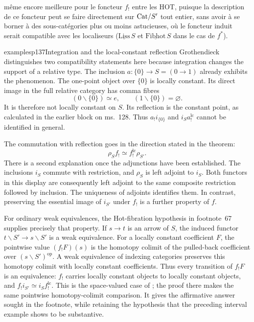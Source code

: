 même encore meilleure pour le foncteur $f_!$ entre les HOT, puisque la description de ce foncteur peut se faire directement sur $\mathrm{Cat}/S'$ tout entier, sans avoir à se borner à des sous-catégories plus ou moins astucieuses, où le foncteur induit serait compatible avec les localiseurs ($\underline{\mathrm{Liss}}\,S$ et $\underline{\mathrm{Fibhot}}\,S$ dans le cas de $f^*$).

\begin{dcomment}{examples}{p137}{Integration and the local-constant reflection}
Grothendieck distinguishes two compatibility statements here because integration changes the support of a relative type. The inclusion $a:\{0\}\to S=(0\to1)$ already exhibits the phenomenon. The one-point object over $\{0\}$ is locally constant. Its direct image in the full relative category has comma fibres
\[
 (0\backslash\{0\})\simeq e,
 \qquad (1\backslash\{0\})=\varnothing.
\]
It is therefore not locally constant on $S$. Its reflection is the constant point, as calculated in the earlier block on ms.~128. Thus $a_!i_{\{0\}}$ and $i_Sa_!^{\mathrm{lc}}$ cannot be identified in general.

The commutation with reflection goes in the direction stated in the theorem:
\[
 \rho_S f_!\simeq f_!^{\mathrm{lc}}\rho_{S'}.
\]
There is a second explanation once the adjunctions have been established. The inclusions $i_S$ commute with restriction, and $\rho_S$ is left adjoint to $i_S$. Both functors in this display are consequently left adjoint to the same composite restriction followed by inclusion. The uniqueness of adjoints identifies them. In contrast, preserving the essential image of $i_{S'}$ under $f_!$ is a further property of $f$.

For ordinary weak equivalences, the Hot-fibration hypothesis in footnote~67 supplies precisely that property. If $s\to t$ is an arrow of $S$, the induced functor $t\backslash S'\to s\backslash S'$ is a weak equivalence. For a locally constant coefficient $F$, the pointwise value $(f_!F)(s)$ is the homotopy colimit of the pulled-back coefficient over $(s\backslash S')^{\mathrm{op}}$. A weak equivalence of indexing categories preserves this homotopy colimit with locally constant coefficients. Thus every transition of $f_!F$ is an equivalence: $f_!$ carries locally constant objects to locally constant objects, and $f_!i_{S'}\simeq i_S f_!^{\mathrm{lc}}$. This is the space-valued case of \citet[Proposition~1.24, applied to the opposite indexing convention]{Cisinski2009LocallyConstant}; the proof there makes the same pointwise homotopy-colimit comparison. It gives the affirmative answer sought in the footnote, while retaining the hypothesis that the preceding interval example shows to be substantive.


\end{dcomment}
